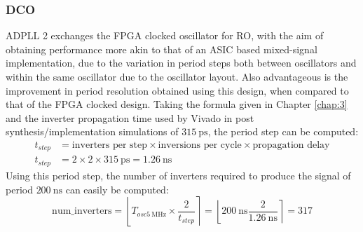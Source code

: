 \subsubsection{\acl{DCO}}
\ac{ADPLL} 2 exchanges the \ac{FPGA} clocked oscillator for \ac{RO}, with the aim of obtaining performance more akin to that of an \ac{ASIC} based mixed-signal implementation, due to the variation in period steps both between oscillators and within the same oscillator due to the oscillator layout. Also advantageous is the improvement in period resolution obtained using this design, when compared to that of the \ac{FPGA} clocked design. Taking the formula given in Chapter \ref{chap:3} and the inverter propagation time used by Vivado in post synthesis/implementation simulations of $315~\si{\pico\second}$, the period step can be computed:
\begin{align}
t_{step} &= \text{inverters per step}\times\text{inversions per cycle}\times\text{propagation delay} \\
t_{step} &= 2\times 2\times 315~\si{\pico\second} = 1.26~\si{\nano\second}
\end{align}
Using this period step, the number of inverters required to produce the signal of period $200~\si{\nano\second}$ can easily be computed:
\begin{equation}
\text{num\_inverters} = \left \lfloor{ T_{osc 5~\si{\mega\hertz}}\times \frac{2}{t_{step}}}\right \rceil = \left \lfloor{ 200~\si{\nano\second}\frac{2}{1.26~\si{\nano\second}}}\right \rceil = 317
\end{equation}

